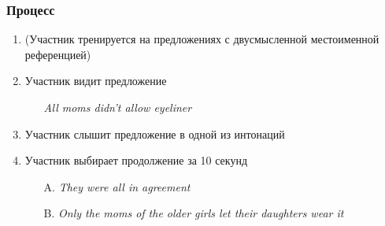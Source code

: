\documentclass{beamer}
\begin{document}
\begin{frame}
    \frametitle{Процесс}

    \begin{enumerate}
        \item (Участник тренируется на предложениях с двусмысленной местоименной референцией)
        \item Участник видит предложение
        \begin{itemize}
            \item[] \textit{All moms didn't allow eyeliner}
        \end{itemize}
        \item Участник слышит предложение в одной из интонаций
        \item Участник выбирает продолжение за 10 секунд
        \begin{itemize}
            \item[A.] \textit{They were all in agreement}
            \item[B.] \textit{Only the moms of the older girls let their daughters wear it}
        \end{itemize}
    \end{enumerate}

\end{frame}
\end{document}
